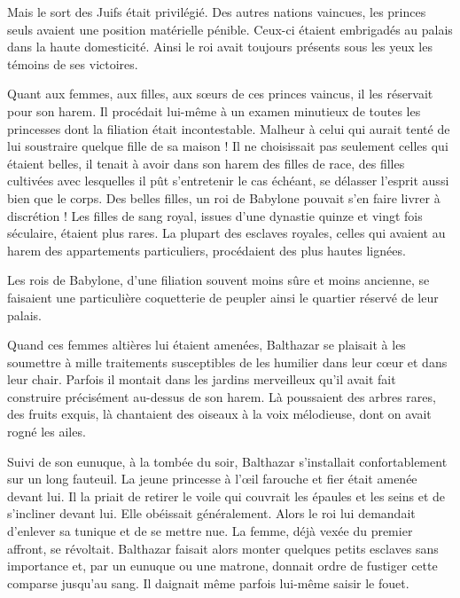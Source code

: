 \documentclass[a4paper, 11pt, oneside, polutonikogreek, french]{article}
\begin{document}
Mais le sort des Juifs était privilégié. Des autres nations vaincues, les princes seuls avaient une position matérielle pénible. Ceux-ci étaient embrigadés au palais dans la haute domesticité. Ainsi le roi avait toujours présents sous les yeux les témoins de ses victoires.

\bigskip
\centerline{\EightStarTaper}
\centerline{\EightStarTaper\EightStarTaper}
\bigskip

Quant aux femmes, aux filles, aux sœurs de ces princes vaincus, il les réservait pour son harem. Il procédait lui-même à un examen minutieux de toutes les princesses dont la filiation était incontestable. Malheur à celui qui aurait tenté de lui soustraire quelque fille de sa maison ! Il ne choisissait pas seulement celles qui étaient belles, il tenait à avoir dans son harem des filles de race, des filles cultivées avec lesquelles il pût s'entretenir le cas échéant, se délasser l'esprit aussi bien que le corps. Des belles filles, un roi de Babylone pouvait s'en faire livrer à discrétion ! Les filles de sang royal, issues d'une dynastie quinze et vingt fois séculaire, étaient plus rares. La plupart des esclaves royales, celles qui avaient au harem des appartements particuliers, procédaient des plus hautes lignées.

Les rois de Babylone, d'une filiation souvent moins sûre et moins ancienne, se faisaient une particulière coquetterie de peupler ainsi le quartier réservé de leur palais.

\bigskip
\centerline{\EightStarTaper}
\centerline{\EightStarTaper\EightStarTaper}
\bigskip

Quand ces femmes altières lui étaient amenées, Balthazar se plaisait à les soumettre à mille traitements susceptibles de les humilier dans leur cœur et dans leur chair. Parfois il montait dans les jardins merveilleux qu'il avait fait construire précisément au-dessus de son harem. Là poussaient des arbres rares, des fruits exquis, là chantaient des oiseaux à la voix mélodieuse, dont on avait rogné les ailes.

Suivi de son eunuque, à la tombée du soir, Balthazar s'installait confortablement sur un long fauteuil. La jeune princesse à l'œil farouche et fier était amenée devant lui. Il la priait de retirer le voile qui couvrait les épaules et les seins et de s'incliner devant lui. Elle obéissait généralement. Alors le roi lui demandait d'enlever sa tunique et de se mettre nue. La femme, déjà vexée du premier affront, se révoltait. Balthazar faisait alors monter quelques petits esclaves sans importance et, par un eunuque ou une matrone, donnait ordre de fustiger cette comparse jusqu'au sang. Il daignait même parfois lui-même saisir le fouet.
\end{document}
